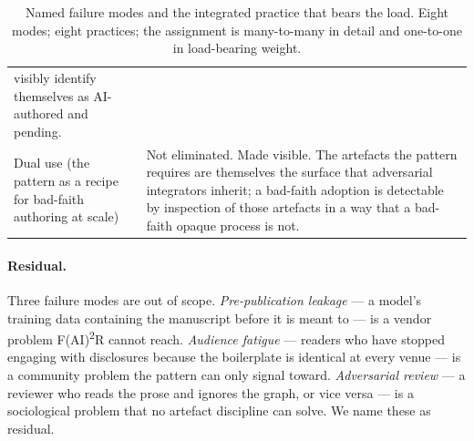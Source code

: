 \begin{table}[!ht]
\begin{tabular}{p{3.6cm}p{8cm}}
    visibly identify themselves as AI-authored and pending. \\
Dual use (the pattern as a recipe for bad-faith authoring at scale)
  & Not eliminated. Made visible. The artefacts the pattern requires
    are themselves the surface that adversarial integrators inherit;
    a bad-faith adoption is detectable by inspection of those
    artefacts in a way that a bad-faith opaque process is not. \\
\bottomrule
\end{tabular}
\caption{Named failure modes and the integrated practice that bears
the load. Eight modes; eight practices; the assignment is many-to-many
in detail and one-to-one in load-bearing weight.}
\label{tab:failure-modes}
\end{table}



\paragraph{Residual.}\label{sec:fm-residual}
Three failure modes are out of scope. \emph{Pre-publication leakage}
--- a model's training data containing the manuscript before it is
meant to --- is a vendor problem F(AI)\textsuperscript{2}R cannot
reach. \emph{Audience fatigue} --- readers who have stopped engaging
with disclosures because the boilerplate is identical at every venue
--- is a community problem the pattern can only signal toward.
\emph{Adversarial review} --- a reviewer who reads the prose and
ignores the graph, or vice versa --- is a sociological problem that
no artefact discipline can solve. We name these as residual.
